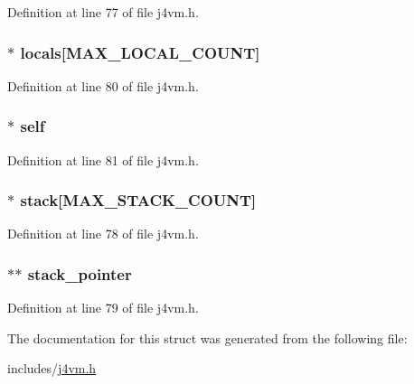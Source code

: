 Definition at line 77 of file j4vm.\+h.

\hypertarget{structjayfor__vm_acbb8263d413c9418484d2d8fe1d3e942}{
\subsubsection[{locals}]{$\ast$ locals\mbox{[}{\bf M\+A\+X\+\_\+\+L\+O\+C\+A\+L\+\_\+\+C\+O\+U\+N\+T}\mbox{]}}}\label{structjayfor__vm_acbb8263d413c9418484d2d8fe1d3e942}


Definition at line 80 of file j4vm.\+h.

\hypertarget{structjayfor__vm_a30bf32adebb387eaeaeb9387672cca3d}{
\subsubsection[{self}]{$\ast$ self}}\label{structjayfor__vm_a30bf32adebb387eaeaeb9387672cca3d}


Definition at line 81 of file j4vm.\+h.

\hypertarget{structjayfor__vm_a38909de25e024c1fcd1ed38094cefbff}{
\subsubsection[{stack}]{$\ast$ stack\mbox{[}{\bf M\+A\+X\+\_\+\+S\+T\+A\+C\+K\+\_\+\+C\+O\+U\+N\+T}\mbox{]}}}\label{structjayfor__vm_a38909de25e024c1fcd1ed38094cefbff}


Definition at line 78 of file j4vm.\+h.

\hypertarget{structjayfor__vm_a8b3f92ea26da8098f5e4f4404e8e3334}{
\subsubsection[{stack\+\_\+pointer}]{$\ast$$\ast$ stack\+\_\+pointer}}\label{structjayfor__vm_a8b3f92ea26da8098f5e4f4404e8e3334}


Definition at line 79 of file j4vm.\+h.



The documentation for this struct was generated from the following file\+:\begin{DoxyCompactItemize}
\item 
includes/\hyperlink{j4vm_8h}{j4vm.\+h}\end{DoxyCompactItemize}

